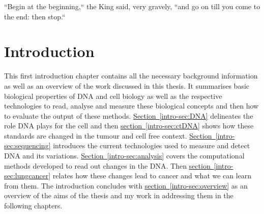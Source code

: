 
\begin{savequote}[85mm]
``Begin at the beginning,`` the King said, very gravely, ``and go on till you come to the end: then stop.``
\end{savequote}

\chapter{Introduction}
\label{ch:intro}



This first introduction chapter contains all the necessary background information as well as an overview of the work discussed in this thesis. It summarises basic biological properties of DNA and cell biology as well as the respective technologies to read, analyse and measure these biological concepts and then how to evaluate the output of these methods.
\hyperref[intro-sec:DNA]{Section~\ref*{intro-sec:DNA}} delineates the role DNA plays for the cell and then \hyperref[intro-sec:ctDNA]{section~\ref{intro-sec:ctDNA}} shows how these standards are changed in the tumour and cell free context. \hyperref[intro-sec:sequencing]{Section~\ref{intro-sec:sequencing}} introduces the current technologies used to measure and detect DNA and its variations. \hyperref[intro-sec:analysis]{Section~\ref*{intro-sec:analysis}} covers the computational methods developed to read out changes in the DNA. Then \hyperref[intro-sec:lungcancer]{section~\ref{intro-sec:lungcancer}} relates how these changes lead to cancer and what we can learn from them. 
The introduction concludes with \hyperref[intro-sec:overview]{section~\ref*{intro-sec:overview}} as an overview of the aims of the thesis and my work in addressing them in the following chapters.















